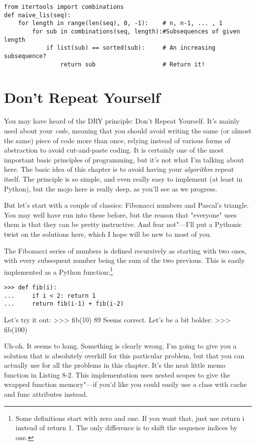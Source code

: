 \begin{lstlisting}[caption={A Naïve Solution to the Longest Increasing Subsequence Problem}]
from itertools import combinations
def naive_lis(seq):
    for length in range(len(seq), 0, -1):    # n, n-1, ... , 1
        for sub in combinations(seq, length):#Subsequences of given length
            if list(sub) == sorted(sub):     # An increasing subsequence?
                return sub                   # Return it!
\end{lstlisting}

\section{Don't Repeat Yourself}
You may have heard of the DRY principle: Don't Repeat Yourself. It's mainly used about your \textit{code}, meaning that you should avoid writing the same (or almost the same) piece of code more than once, relying instead of various forms of abstraction to avoid cut-and-paste coding. It is certainly one of the most important basic principles of programming, but it's not what I'm talking about here. The basic idea of this chapter is to avoid having your \textit{algorithm} repeat itself. The principle is so simple, and even really easy to implement (at least in Python), but the mojo here is really deep, as you'll see as we progress.

But let's start with a couple of classics: Fibonacci numbers and Pascal's triangle. You may well have run into these before, but the reason that "everyone" uses them is that they can be pretty instructive. And fear not"---I'll put a Pythonic twist on the solutions here, which I hope will be new to most of you.

The Fibonacci series of numbers is defined recursively as starting with two ones, with every subsequent number being the sum of the two previous. This is easily implemented as a Python function:\footnote{Some definitions start with zero and one. If you want that, just use return i instead of return 1. The only difference is to shift the sequence indices by one.
}
\begin{lstlisting}
>>> def fib(i):
...     if i < 2: return 1
...     return fib(i-1) + fib(i-2)
\end{lstlisting}
Let's try it out:
>>> fib(10)
89
Seems correct. Let's be a bit bolder:
>>> fib(100)

Uh-oh. It seems to hang. Something is clearly wrong. I'm going to give you a solution that is absolutely overkill for this particular problem, but that you can actually use for all the problems in this chapter. It's the neat little memo function in Listing 8-2. This implementation uses nested scopes to give the wrapped function memory"---if you'd like you could easily use a class with cache and func attributes instead.


